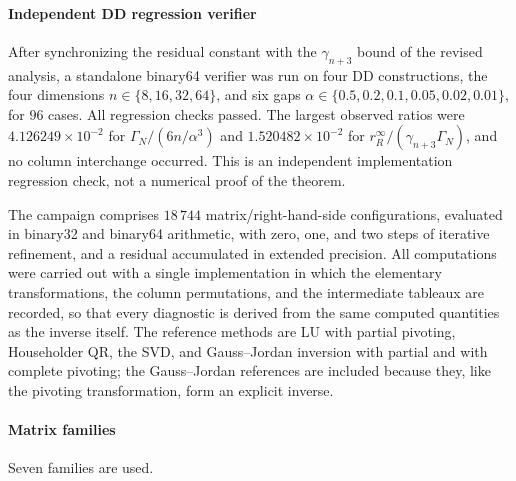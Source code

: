 \documentclass[supplement,review,onefignum,onetabnum]{siamart251216}
\begin{document}
\paragraph{Independent DD regression verifier}
After synchronizing the residual constant with the $\gamma_{n+3}$ bound of the revised analysis, a
standalone binary64 verifier was run on four DD constructions, the four dimensions
$n\in\{8,16,32,64\}$, and six gaps $\alpha\in\{0.5,0.2,0.1,0.05,0.02,0.01\}$, for $96$ cases.
All regression checks passed. The largest observed ratios were $4.126249\times10^{-2}$ for
$\Gamma_N/(6n/\alpha^3)$ and $1.520482\times10^{-2}$ for
$r_R^\infty/(\gamma_{n+3}\Gamma_N)$, and no column interchange occurred. This is an independent
implementation regression check, not a numerical proof of the theorem.

The campaign comprises $18\,744$ matrix/right-hand-side configurations,
evaluated in binary32 and binary64 arithmetic, with zero, one, and two steps of
iterative refinement, and a residual accumulated in extended precision. All
computations were carried out with a single implementation in which the
elementary transformations, the column permutations, and the intermediate
tableaux are recorded, so that every diagnostic is derived from the same
computed quantities as the inverse itself. The reference methods are LU with
partial pivoting, Householder QR, the SVD, and Gauss--Jordan inversion with
partial and with complete pivoting; the Gauss--Jordan references are included
because they, like the pivoting transformation, form an explicit inverse.

\paragraph{Matrix families}
Seven families are used.
\end{document}
